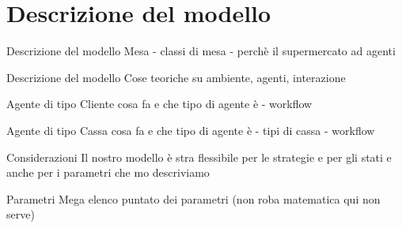 \section{Descrizione del modello}
\begin{frame}{Descrizione del modello}
	\centering
	Mesa - classi di mesa - perchè il supermercato ad agenti
\end{frame}

\begin{frame}{Descrizione del modello}
	\centering
	Cose teoriche su ambiente, agenti, interazione
\end{frame}

\begin{frame}{Agente di tipo Cliente}
	\centering
	cosa fa e che tipo di agente è - workflow
\end{frame}

\begin{frame}{Agente di tipo Cassa}
	\centering
	cosa fa e che tipo di agente è - tipi di cassa - workflow
\end{frame}

\begin{frame}{Considerazioni}
	\centering
	Il nostro modello è stra flessibile per le strategie e per gli stati e anche per i parametri che mo descriviamo
\end{frame}

\begin{frame}{Parametri}
	\centering
	Mega elenco puntato dei parametri (non roba matematica qui non serve)
\end{frame}